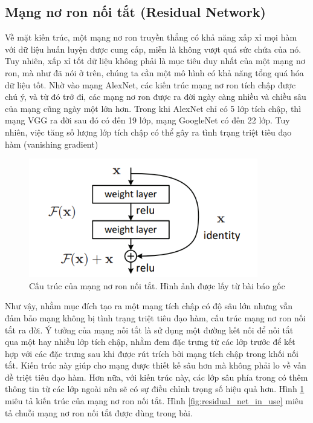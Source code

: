 \subsection{Mạng nơ ron nối tắt (Residual Network)}

Về mặt kiến trúc, một mạng nơ ron truyền thẳng có khả năng xấp xỉ mọi hàm với dữ liệu huấn luyện được cung cấp, miễn là không vượt quá sức chứa của nó. Tuy nhiên, xấp xỉ tốt dữ liệu không phải là mục tiêu duy nhất của một mạng nơ ron, mà như đã nói ở trên, chúng ta cần một mô hình có khả năng tổng quá hóa dữ liệu tốt. Nhờ vào mạng AlexNet, các kiến trúc mạng nơ ron tích chập được chú ý, và từ đó trở đi, các mạng nơ ron được ra đời ngày càng nhiều và chiều sâu của mạng cũng ngày một lớn hơn. Trong khi AlexNet chỉ có 5 lớp tích chập, thì mạng VGG ra đời sau đó có đến 19 lớp, mạng GoogleNet có đến 22 lớp. Tuy nhiên, việc tăng số lượng lớp tích chập có thể gây ra tình trạng triệt tiêu đạo hàm (vanishing gradient)

\begin{figure}[H]
    \centering
    \includegraphics[width=10cm]{./content/materials/residual_orig.png}
    \caption{Cấu trúc của mạng nơ ron nối tắt. Hình ảnh được lấy từ bài báo gốc \cite{residual}}
    \label{fig:residual_net}
\end{figure}

Như vậy, nhằm mục đích tạo ra một mạng tích chập có độ sâu lớn nhưng vẫn đảm bảo mạng không bị tình trạng triệt tiêu đạo hàm, cấu trúc mạng nơ ron nối tắt ra đời. Ý tưởng của mạng nối tắt là sử dụng một đường kết nối để nối tắt qua một hay nhiều lớp tích chập, nhằm đem đặc trưng từ các lớp trước để kết hợp với các đặc trưng sau khi được rút trích bởi mạng tích chập trong khối nối tắt. Kiến trúc này giúp cho mạng được thiết kế sâu hơn mà không phải lo về vấn đề triệt tiêu đạo hàm. Hơn nữa, với kiến trúc này, các lớp sâu phía trong có thêm thông tin từ các lớp ngoài nên sẽ có sự điều chỉnh trọng số hiệu quả hơn. Hình \ref{fig:residual_net} miêu tả kiến trúc của mạng nơ ron nối tắt. Hình \ref{fig:residual_net_in_use} miêu tả chuỗi mạng nơ ron nối tắt được dùng trong bài.

